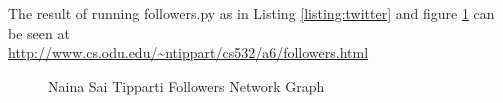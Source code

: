 The result of running followers.py as in Listing \ref{listing:twitter} and figure \ref{fig:followers_graph} can be seen at\\
\url{http://www.cs.odu.edu/~ntippart/cs532/a6/followers.html}
\begin{figure}[h!]
\centering
{}
\caption{Naina Sai Tipparti Followers Network Graph}
\label{fig:followers_graph}
\end{figure}

